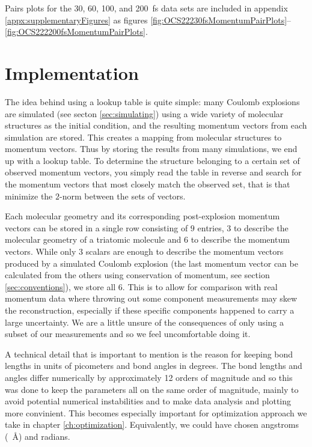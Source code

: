 Pairs plots for the 30, 60, 100, and \SI{200}{\fs} data sets are included in appendix \ref{appx:supplementaryFigures} as figures \ref{fig:OCS22230fsMomentumPairPlots}--\ref{fig:OCS222200fsMomentumPairPlots}.

\section{Implementation}
The idea behind using a lookup table is quite simple: many Coulomb explosions are simulated (see secton \ref{sec:simulating}) using a wide variety of molecular structures as the initial condition, and the resulting momentum vectors from each simulation are stored. This creates a mapping from molecular structures to momentum vectors. Thus by storing the results from many simulations, we end up with a lookup table. To determine the structure belonging to a certain set of observed momentum vectors, you simply read the table in reverse and search for the momentum vectors that most closely match the observed set, that is that minimize the $2$-norm between the sets of vectors.

Each molecular geometry and its corresponding post-explosion momentum vectors can be stored in a single row consisting of $9$ entries, $3$ to describe the molecular geometry of a triatomic molecule and $6$ to describe the momentum vectors. While only $3$ scalars are enough to describe the momentum vectors produced by a simulated Coulomb explosion (the last momentum vector can be calculated from the others using conservation of momentum, see section \ref{sec:conventions}), we store all $6$. This is to allow for comparison with real momentum data where throwing out some component measurements may skew the reconstruction, especially if these specific components happened to carry a large uncertainty. We are a little unsure of the consequences of only using a subset of our measurements and so we feel uncomfortable doing it. 

A technical detail that is important to mention is the reason for keeping bond lengths in units of picometers and bond angles in degrees. The bond lengths and angles differ numerically by approximately 12 orders of magnitude and so this was done to keep the parameters all on the same order of magnitude, mainly to avoid potential numerical instabilities and to make data analysis and plotting more convinient. This becomes especially important for optimization approach we take in chapter \ref{ch:optimization}. Equivalently, we could have chosen angstroms (\SI{}{\angstrom}) and radians.

